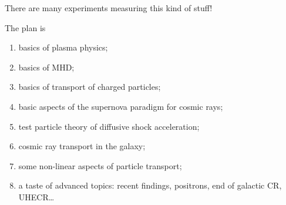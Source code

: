 \documentclass[main.tex]{subfiles}
\begin{document}
There are many experiments measuring this kind of stuff! 

The plan is 
\begin{enumerate}
    \item basics of plasma physics;
    \item basics of MHD;
    \item basics of transport of charged particles;
    \item basic aspects of the supernova paradigm for cosmic rays;
    \item test particle theory of diffusive shock acceleration;
    \item cosmic ray transport in the galaxy;
    \item some non-linear aspects of particle transport;
    \item a taste of advanced topics: 
        recent findings, positrons, end of galactic CR, UHECR\dots
\end{enumerate}
\end{document}
